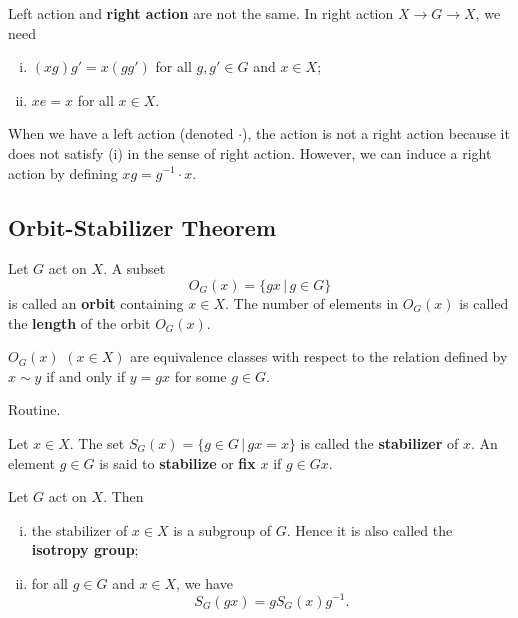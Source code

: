 \begin{remark}
\begin{remark}
Left action and \textbf{right action} are not the same. In right action $X\rightarrow G\rightarrow X$, we need 
	\begin{enumerate}[(i)]
		\item $(xg)g' = x(gg')$ for all  $g,g'\in G$ and $x\in X$;
		\item $xe =x$ for all $x\in X$.
	\end{enumerate}
	When we have a left action (denoted $\cdot$),  the action is not a right action because it does not satisfy (i) in the sense of right action. However, we can induce a right action by defining $xg = g^{-1}\cdot x$.
	\end{remark}
\end{remark}

\subsection{Orbit-Stabilizer Theorem}
\begin{definition}
	Let $G$ act on $X$. A subset \begin{equation*}
		O_G(x) = \{gx\,|\, g\in G\}
	\end{equation*}
	is called an \textbf{orbit} containing $x\in X$. The number of elements in $O_G(x)$ is called the \textbf{length} of the orbit $O_G(x)$. 
\end{definition}
\begin{proposition} \label{prop-orbits-are-eqv-classes}
	$O_G(x)$ $(x\in X)$ are equivalence classes with respect to the relation defined by $x\sim y$ if and only if $y=gx$ for some $g\in G$.
\end{proposition}
\begin{sketch}
	Routine.
\end{sketch}
\begin{definition}
	Let $x\in X$. The set $S_G(x) = \{g\in G\,|\, gx = x\}$ is called the \textbf{stabilizer} of $x$. An element $g\in G$ is said to \textbf{stabilize} or \textbf{fix} $x$ if $g\in Gx$.
\end{definition}
\begin{proposition}  \label{prop-stabilizer}
	Let $G$ act on $X$. Then
	\begin{enumerate}[(i)]
		\item the stabilizer of $x\in X$ is a subgroup of $G$. Hence it is also called the \textbf{isotropy group};
		\item for all $g\in G$ and $x\in X$, we have
		\begin{equation*}
			S_G(gx) = gS_G(x)g^{-1}.
		\end{equation*}
	\end{enumerate}
\end{proposition}
